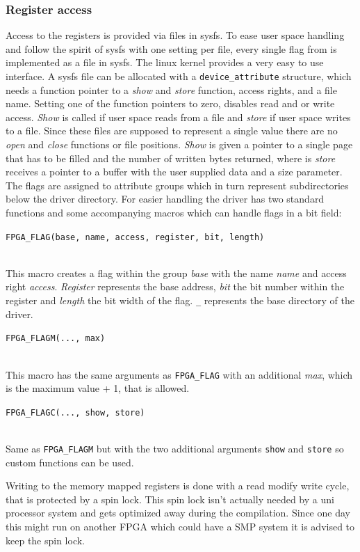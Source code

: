\documentclass[11pt,technote,a4paper,onecolumn,dvips]{IEEEtran}
\newcommand*{\lstitem}[1]{
  \setbox0\hbox{\lstinline{#1}}  
  \item[\usebox0]  
  \hfill \\
}
\begin{document}
\subsubsection{Register access}
Access to the registers is provided via files in sysfs\cite{sysfs}. To ease
user space handling and follow the spirit of sysfs with one setting per file,
every single flag from  is implemented as a file in
sysfs. The linux kernel provides a very easy to use interface. A sysfs file
can be allocated with a \lstinline+device_attribute+ structure, which needs
a function pointer to a \emph{show} and \emph{store} function, access rights,
and a file name. Setting one of the function pointers to zero, disables read
and or write access. \emph{Show} is called if user space reads from a file 
and \emph{store} if user space writes to a file. Since these files are
supposed to represent a single value there are no \emph{open} and \emph{close}
functions or file positions. \emph{Show} is given a pointer to a single page
that has to be filled and the number of written bytes returned, where is
\emph{store} receives a pointer to a buffer with the user supplied data and
a size parameter.\\
The flags are assigned to attribute groups which in turn represent
subdirectories below the driver directory. For easier handling the driver
has two standard functions and some accompanying macros which can handle
flags in a bit field:
\begin{description}
    \lstitem{FPGA_FLAG(base, name, access, register, bit, length)}
        This macro creates a flag within the group \emph{base} with the name
        \emph{name} and access right \emph{access}. \emph{Register} represents
        the base address, \emph{bit} the bit number within the register and
        \emph{length} the bit width of the flag. \lstinline+_+ represents the
        base directory of the driver.
    \lstitem{FPGA_FLAGM(..., max)}
        This macro has the same arguments as \lstinline+FPGA_FLAG+ with an
        additional \emph{max}, which is the maximum value + 1, that is allowed.
    \lstitem{FPGA_FLAGC(..., show, store)}
        Same as \lstinline+FPGA_FLAGM+ but with the two additional
        arguments \lstinline+show+ and \lstinline+store+ so custom functions
        can be used.
\end{description}
Writing to the memory mapped registers is done with a read modify write cycle,
that is protected by a spin lock. This spin lock isn't actually needed by a
uni processor system and gets optimized away during the compilation. Since
one day this might run on another FPGA which could have a SMP system it is
advised to keep the spin lock.
\end{document}
